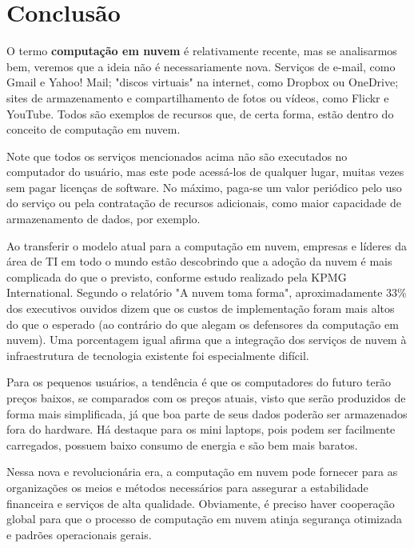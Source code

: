 \chapter{Conclusão}

O termo \textbf{computação em nuvem} é relativamente recente, mas se analisarmos bem,
veremos que a ideia não é necessariamente nova. Serviços de e-mail, como Gmail e
Yahoo! Mail; "discos virtuais" na internet, como Dropbox ou OneDrive; sites de
armazenamento e compartilhamento de fotos ou vídeos, como Flickr e YouTube. Todos são
exemplos de recursos que, de certa forma, estão dentro do conceito de computação em
nuvem.

Note que todos os serviços mencionados acima não são executados no computador do
usuário, mas este pode acessá-los de qualquer lugar, muitas vezes sem pagar licenças
de software. No máximo, paga-se um valor periódico pelo uso do serviço ou pela
contratação de recursos adicionais, como maior capacidade de armazenamento de dados,
por exemplo.

Ao transferir o modelo atual para a computação em nuvem, empresas e líderes da área
de TI em todo o mundo estão descobrindo que a adoção da nuvem é mais complicada do
que o previsto, conforme estudo realizado pela KPMG International. Segundo o
relatório "A nuvem toma forma", aproximadamente 33\% dos executivos ouvidos dizem
que os custos de implementação foram mais altos do que o esperado (ao contrário do
que alegam os defensores da computação em nuvem). Uma porcentagem igual afirma que
a integração dos serviços de nuvem à infraestrutura de tecnologia existente foi
especialmente difícil.

Para os pequenos usuários, a tendência é que os computadores do futuro terão preços
baixos, se comparados com os preços atuais, visto que serão produzidos de forma mais
simplificada, já que boa parte de seus dados poderão ser armazenados fora do
hardware. Há destaque para os mini laptops, pois podem ser facilmente carregados,
possuem baixo consumo de energia e são bem mais baratos.

Nessa nova e revolucionária era, a computação em nuvem pode fornecer para as
organizações os meios e métodos necessários para assegurar a estabilidade
financeira e serviços de alta qualidade. Obviamente, é preciso haver cooperação
global para que o processo de computação em nuvem atinja segurança otimizada e
padrões operacionais gerais. 
